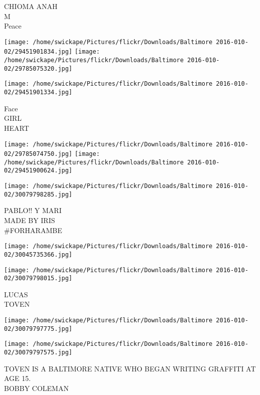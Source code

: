 \documentclass[10pt,letterpaper]{article}
\begin{document}
CHIOMA ANAH\\
M\\
Peace\\
\pagebreak

\texttt{[image: /home/swickape/Pictures/flickr/Downloads/Baltimore 2016-010-02/29451901834.jpg]}
\texttt{[image: /home/swickape/Pictures/flickr/Downloads/Baltimore 2016-010-02/29785075320.jpg]}

\vspace{0.25in}
\texttt{[image: /home/swickape/Pictures/flickr/Downloads/Baltimore 2016-010-02/29451901334.jpg]}

Face\\
GIRL\\
HEART\\
\pagebreak

\texttt{[image: /home/swickape/Pictures/flickr/Downloads/Baltimore 2016-010-02/29785074750.jpg]}
\texttt{[image: /home/swickape/Pictures/flickr/Downloads/Baltimore 2016-010-02/29451900624.jpg]}

\vspace{0.25in}
\texttt{[image: /home/swickape/Pictures/flickr/Downloads/Baltimore 2016-010-02/30079798285.jpg]}

PABLO!! Y MARI\\
MADE BY IRIS\\
\#FORHARAMBE\\
\pagebreak

\texttt{[image: /home/swickape/Pictures/flickr/Downloads/Baltimore 2016-010-02/30045735366.jpg]}

\vspace{0.25in}
\texttt{[image: /home/swickape/Pictures/flickr/Downloads/Baltimore 2016-010-02/30079798015.jpg]}

LUCAS\\
TOVEN\\
\pagebreak

\texttt{[image: /home/swickape/Pictures/flickr/Downloads/Baltimore 2016-010-02/30079797775.jpg]}

\vspace{0.25in}
\texttt{[image: /home/swickape/Pictures/flickr/Downloads/Baltimore 2016-010-02/30079797575.jpg]}

TOVEN IS A BALTIMORE NATIVE WHO BEGAN WRITING GRAFFITI AT AGE 15.\\
BOBBY COLEMAN\\
\pagebreak
\end{document}
